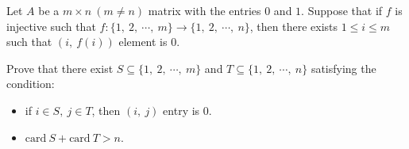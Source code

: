Let $ A$ be a $ m\times n\ (m\neq n)$ matrix with the entries $ 0$ and $ 1$. Suppose that if $ f$ is injective such that $ f: \{1,\ 2,\ \cdots ,\ m\}\longrightarrow \{1,\ 2,\ \cdots ,\ n\}$, then there exists $ 1\leq i\leq m$ such that $ (i,\ f(i))$ element is $ 0$.

Prove that there exist $ S\subseteq \{1,\ 2,\ \cdots ,\ m\}$ and $ T\subseteq \{1,\ 2,\ \cdots ,\ n\}$ satisfying the condition:

\begin{itemize}
	\item if $ i\in{S},\ j\in{T}$, then $ (i,\ j)$ entry is $ 0$.
	\item $\mathrm{card}\ S + \mathrm{card}\ T > n$.
\end{itemize}
